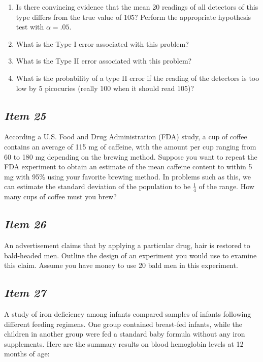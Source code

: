 \documentclass[twoside,openany]{tufte-book}
\begin{document}
\begin{enumerate}[leftmargin=1cm, itemsep=.2em]
\item Is there convincing evidence that the mean 20 readings of all detectors of this type differs from the true value of 105?  Perform the appropriate hypothesis test with $\alpha  = .05$.
\item What is the Type I error associated with this problem?
\item What is the Type II error associated with this problem?
\item What is the probability of a type II error if the reading of the detectors is too low by 5 picocuries (really 100 when it should read 105)?
\end{enumerate}


\subsection{\textbf{\textit{Item 25}}}
According a U.S. Food and Drug Administration (FDA) study, a cup of coffee contains an average of 115 mg of caffeine, with the amount per cup ranging from 60 to 180 mg depending on the brewing method.  Suppose you want to repeat the FDA experiment to obtain an estimate of the mean caffeine content to within 5 mg with 95\% using your favorite brewing method.  In problems such as this, we can estimate the standard deviation of the population to be $\frac{1}{4}$ of the range. How many cups of coffee must you brew?  

\subsection{\textbf{\textit{Item 26}}}
An advertisement claims that by applying a particular drug, hair is restored to bald-headed men.  Outline the design of an experiment you would use to examine this claim.  Assume you have money to use 20 bald men in this experiment.  

\subsection{\textbf{\textit{Item 27}}}
A study of iron deficiency among infants compared samples of infants following different feeding regimens.  One group contained breast-fed infants, while the children in another group were fed a standard baby formula without any iron supplements.  Here are the summary results on blood hemoglobin levels at 12 months of age:
\end{document}
